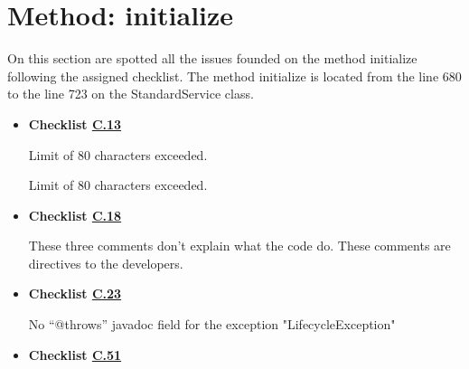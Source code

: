 \documentclass[../../../../codeInspection.tex]{subfiles}
\begin{document}
	\section{Method: initialize}

		On this section are spotted all the issues founded on the method initialize following the assigned checklist.
		The method initialize is located from the line 680 to the line 723 on the StandardService class.

		\begin{itemize}

			\item \textbf{Checklist \hyperref[C:13]{C.13}}

				  

				  Limit of 80 characters exceeded.

				  

				  Limit of 80 characters exceeded.

			\item \textbf{Checklist \hyperref[C:18]{C.18}}

				  

				  

				  

				  These three comments don't explain what the code do. These comments are directives to the developers.

			\item \textbf{Checklist \hyperref[C:23]{C.23}}

				  

				  No “@throws” javadoc field for the exception "LifecycleException"

			\item \textbf{Checklist \hyperref[C:51]{C.51}}

				  


\end{itemize}
\end{document}
